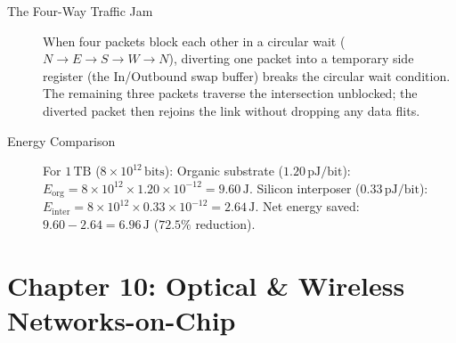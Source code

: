 \begin{description}
    \item[The Four-Way Traffic Jam] When four packets block each other in a circular wait ($N \to E \to S \to W \to N$), diverting one packet into a temporary side register (the In/Outbound swap buffer) breaks the circular wait condition. The remaining three packets traverse the intersection unblocked; the diverted packet then rejoins the link without dropping any data flits.

    \item[Energy Comparison] For $1\,\mathrm{TB}$ ($8 \times 10^{12}\,\mathrm{bits}$):
    Organic substrate ($1.20\,\mathrm{pJ/bit}$): $E_{\mathrm{org}} = 8 \times 10^{12} \times 1.20 \times 10^{-12} = \mathbf{9.60\,\mathrm{J}}$.
    Silicon interposer ($0.33\,\mathrm{pJ/bit}$): $E_{\mathrm{inter}} = 8 \times 10^{12} \times 0.33 \times 10^{-12} = \mathbf{2.64\,\mathrm{J}}$.
    Net energy saved: $9.60 - 2.64 = \mathbf{6.96\,\mathrm{J}}$ ($72.5\%$ reduction).
\end{description}

\section*{Chapter 10: Optical \& Wireless Networks-on-Chip}

